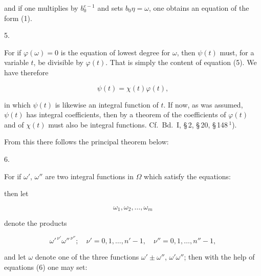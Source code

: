 and if one multiplies by $b_0^{e-1}$ and sets $b_0\eta = \omega$, one obtains an equation
of the form (1).

5.\ 



For if $\varphi(\omega) = 0$ is the equation of lowest degree for $\omega$, then $\psi(t)$
must, for a variable $t$, be divisible by $\varphi(t)$. That is simply the content of
equation (5). We have therefore

\[
\psi(t) = \chi(t)\varphi(t),
\]

in which $\psi(t)$ is likewise an integral function of $t$.
If now, as was assumed,
$\psi(t)$ has integral coefficients, then by a theorem of  the
coefficients of $\varphi(t)$ and of $\chi(t)$ must also be integral functions. Cf.\ Bd.\ I,
\S\,2, \S\,20, \S\,148\,$^1$).

From this there follows the principal theorem below:

6.\ 

For if $\omega'$, $\omega''$ are two integral functions in $\Omega$ which satisfy the
equations:


then let

\[
\omega_1, \omega_2, \ldots, \omega_m
\]

denote the products

\[
\omega'^{\,\nu'}\omega''^{\,\nu''}; \quad \nu' = 0, 1, \ldots, n'-1, \quad
\nu'' = 0, 1, \ldots, n''-1,
\]

and let $\omega$ denote one of the three functions $\omega' \pm \omega''$,
$\omega'\omega''$; then with the help of equations (6) one may set:

